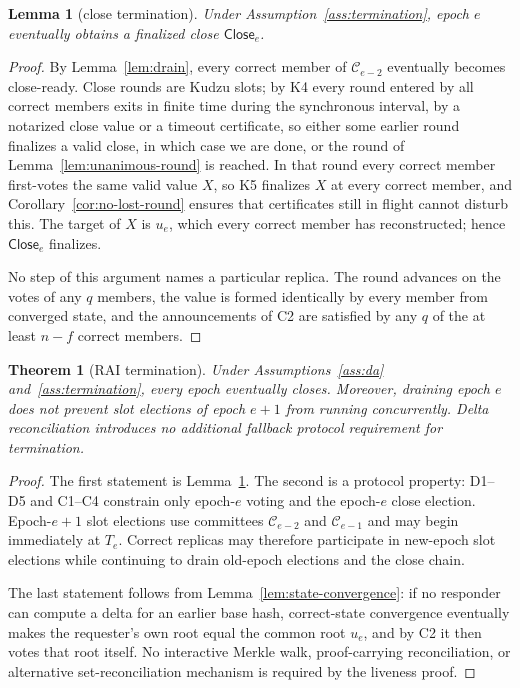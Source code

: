 \documentclass[11pt]{article}
\newtheorem{lemma}{Lemma}
\newtheorem{theorem}{Theorem}
\theoremstyle{remark}
\newcommand{\C}{\mathcal{C}}
\newcommand{\CE}{\mathsf{Close}}
\begin{document}
\begin{lemma}[close termination]
\label{lem:close-termination}
Under Assumption~\ref{ass:termination}, epoch $e$ eventually obtains a finalized close $\CE_e$.
\end{lemma}

\begin{proof}
By Lemma~\ref{lem:drain}, every correct member of $\C_{e-2}$ eventually becomes close-ready. Close rounds are Kudzu slots; by K4 every round entered by all correct members exits in finite time during the synchronous interval, by a notarized close value or a timeout certificate, so either some earlier round finalizes a valid close, in which case we are done, or the round of Lemma~\ref{lem:unanimous-round} is reached. In that round every correct member first-votes the same valid value $X$, so K5 finalizes $X$ at every correct member, and Corollary~\ref{cor:no-lost-round} ensures that certificates still in flight cannot disturb this. The target of $X$ is $u_e$, which every correct member has reconstructed; hence $\CE_e$ finalizes.

No step of this argument names a particular replica. The round advances on the votes of any $q$ members, the value is formed identically by every member from converged state, and the announcements of C2 are satisfied by any $q$ of the at least $n-f$ correct members.
\end{proof}

\begin{theorem}[RAI termination]
\label{thm:termination}
Under Assumptions~\ref{ass:da} and~\ref{ass:termination}, every epoch eventually closes. Moreover, draining epoch $e$ does not prevent slot elections of epoch $e+1$ from running concurrently. Delta reconciliation introduces no additional fallback protocol requirement for termination.
\end{theorem}

\begin{proof}
The first statement is Lemma~\ref{lem:close-termination}. The second is a protocol property: D1--D5 and C1--C4 constrain only epoch-$e$ voting and the epoch-$e$ close election. Epoch-$e+1$ slot elections use committees $\C_{e-2}$ and $\C_{e-1}$ and may begin immediately at $T_e$. Correct replicas may therefore participate in new-epoch slot elections while continuing to drain old-epoch elections and the close chain.

The last statement follows from Lemma~\ref{lem:state-convergence}: if no responder can compute a delta for an earlier base hash, correct-state convergence eventually makes the requester's own root equal the common root $u_e$, and by C2 it then votes that root itself. No interactive Merkle walk, proof-carrying reconciliation, or alternative set-reconciliation mechanism is required by the liveness proof.
\end{proof}
\end{document}
